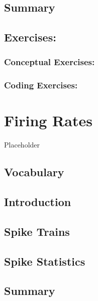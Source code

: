 \documentclass[
]{book}
\begin{document}
\hypertarget{summary}{%
\section{Summary}\label{summary}}

\hypertarget{exercises}{%
\section{Exercises:}\label{exercises}}

\hypertarget{conceptual-exercises}{%
\subsection{Conceptual Exercises:}\label{conceptual-exercises}}

\hypertarget{coding-exercises}{%
\subsection{Coding Exercises:}\label{coding-exercises}}

\hypertarget{Ch5}{%
\chapter{Firing Rates}\label{Ch5}}

Placeholder

\hypertarget{vocabulary}{%
\section{Vocabulary}\label{vocabulary}}

\hypertarget{introduction}{%
\section{Introduction}\label{introduction}}

\hypertarget{spike-trains}{%
\section{Spike Trains}\label{spike-trains}}

\hypertarget{spike-statistics}{%
\section{Spike Statistics}\label{spike-statistics}}

\hypertarget{summary}{%
\section{Summary}\label{summary}}
\end{document}
